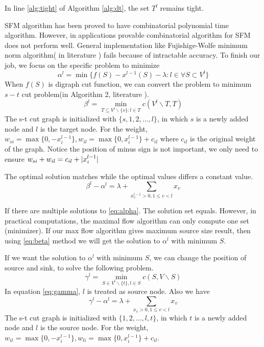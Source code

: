 \documentclass{article}
\begin{document}
In line \ref{alg:tight} of Algorithm \ref{alg:dt}, the set $T^l$ remains tight.

SFM algorithm has been proved to have combinatorial polynomial time algorithm. However, in applications provable combinatorial algorithm for SFM does not perform well. General implementation like Fujishige-Wolfe minimum norm algorithm( in literature \cite{fwrobust}) fails because of intractable accuracy.
To finish our job, we focus on the specific problem to minimize 
\begin{equation}\label{eq:alpha}
\alpha^l = \min \{ f(S) - x^{l-1}(S) - \lambda: l \in \forall S \subset V^l\}
\end{equation}
When $f(S)$ is digraph cut function, we can convert the problem to minimum $s-t$ cut problem(in Algorithm 2, literature \cite{pin}). 
\begin{equation}\label{eq:beta}
\beta^l = \min_{T \subseteq V^l \backslash \{s\}: l \in T} c(V^l \backslash T, T)
\end{equation} 
The s-t cut graph is initialized with $\{s,1,2,\dots, l\}$, in which $s$ is a newly added node and $l$ is the target node. For the weight,
$w_{si}  = \max\{0, - x^{l-1}_i\}, w_{il} = \max\{0, x^{l-1}_i\} + c_{il}$ where $c_{il}$ is the original weight of the graph. Notice the position of minus sign is not important, we only need to ensure
$w_{si} + w_{il} = c_{il} + \lvert x^{l-1}_i\rvert$

The optimal solution matches while the optimal values differs a constant value. 
\begin{equation}
\beta^l - \alpha^l = \lambda + \sum_{x^{l-1}_v>0, 1\leq v<l}x_{v}
\end{equation} 

If there are multiple solutions to \eqref{eq:alpha}. The solution set equals. However, in 
practical computations, the maximal flow algorithm can only compute one set (minimizer).
If our max flow algorithm gives maximum source size result, then using  \eqref{eq:beta} method we will get the solution to $\alpha^l$ with minimum $S$.

If we want the solution to $\alpha^l$ with minimum $S$, we can change the position of source and sink, to solve the following problem.
\begin{equation}\label{eq:gamma}
\gamma^{l} = \min_{S \in V^l \backslash \{t\}, l \in S} c(S, V\backslash S)
\end{equation}
In equation \eqref{eq:gamma}, $l$ is treated as source node.  Also we have
\begin{equation}
\gamma^l - \alpha^l = \lambda + \sum_{x_v>0, 1\leq v<l}x_{v}
\end{equation} 
The s-t cut graph is initialized with $\{1,2,\dots, l,t\}$, in which $t$ is a newly added node and $l$ is the source node. For the weight,
$w_{it}  = \max\{0, - x^{l-1}_i\}, w_{li} = \max\{0, x^{l-1}_i\} + c_{il}$.
\end{document}
